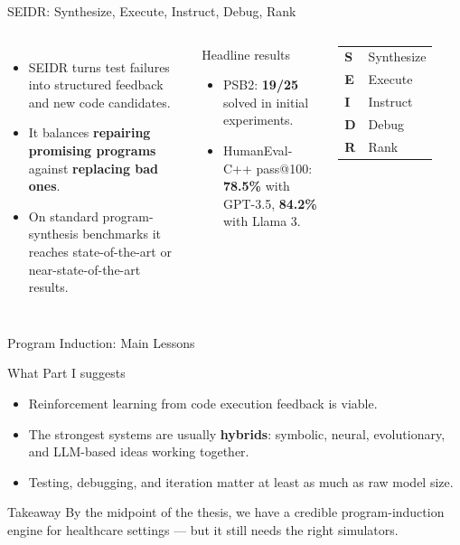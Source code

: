 \documentclass[aspectratio=169,11pt]{beamer}
\newcommand{\takeaway}[1]{%
  \begin{alertblock}{Takeaway}
    #1
  \end{alertblock}
}
\begin{document}
\begin{frame}{SEIDR: Synthesize, Execute, Instruct, Debug, Rank}
  \begin{columns}[T,totalwidth=\textwidth]
      \begin{itemize}
        \item SEIDR turns test failures into structured feedback and new code candidates.
        \item It balances \textbf{repairing promising programs} against \textbf{replacing bad ones}.
        \item On standard program-synthesis benchmarks it reaches state-of-the-art or near-state-of-the-art results.
      \end{itemize}

      \vspace{0.2cm}
      \begin{block}{Headline results}
        \begin{itemize}
          \item PSB2: \textbf{19/25} solved in initial experiments.
          \item HumanEval-C++ pass@100: \textbf{78.5\%} with GPT-3.5, \textbf{84.2\%} with Llama 3.
        \end{itemize}
      \end{block}

      \begin{tabular}{@{}ll@{}}
        \toprule
        \textbf{S} & Synthesize \\
        \textbf{E} & Execute \\
        \textbf{I} & Instruct \\
        \textbf{D} & Debug \\
        \textbf{R} & Rank \\
        \bottomrule
      \end{tabular}
  \end{columns}
\end{frame}

\begin{frame}{Program Induction: Main Lessons}
  \begin{block}{What Part I suggests}
    \begin{itemize}
      \item Reinforcement learning from code execution feedback is viable.
      \item The strongest systems are usually \textbf{hybrids}: symbolic, neural, evolutionary, and LLM-based ideas working together.
      \item Testing, debugging, and iteration matter at least as much as raw model size.
    \end{itemize}
  \end{block}

  \takeaway{By the midpoint of the thesis, we have a credible program-induction engine for healthcare settings --- but it still needs the right simulators.}
\end{frame}
\end{document}
